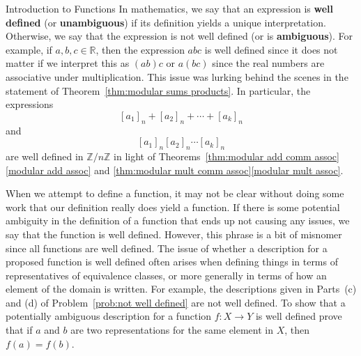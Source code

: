 \begin{section}{Introduction to Functions}
In mathematics, we say that an expression is \textbf{well defined} (or \textbf{unambiguous}) if its definition yields a unique interpretation.  Otherwise, we say that the expression is not well defined (or is \textbf{ambiguous}).  For example, if $a,b,c\in\mathbb{R}$, then the expression $abc$ is well defined since it does not matter if we interpret this as $(ab)c$ or $a(bc)$ since the real numbers are associative under multiplication.  This issue was lurking behind the scenes in the statement of Theorem~\ref{thm:modular sums products}.  In particular, the expressions
\[
[a_1]_n+[a_2]_n+\cdots+ [a_k]_n
\]
and
\[
[a_1]_n [a_2]_n \cdots  [a_k]_n
\]
are well defined in $\mathbb{Z}/n\mathbb{Z}$ in light of Theorems~\ref{thm:modular add comm assoc}\ref{modular add assoc} and \ref{thm:modular mult comm assoc}\ref{modular mult assoc}.

When we attempt to define a function, it may not be clear without doing some work that our definition really does yield a function. If there is some potential ambiguity in the definition of a function that ends up not causing any issues, we say that the function is well defined. However, this phrase is a bit of misnomer since all functions are well defined. The issue of whether a description for a proposed function is well defined often arises when defining things in terms of representatives of equivalence classes, or more generally in terms of how an element of the domain is written.  For example, the descriptions given in Parts~(c) and (d) of Problem~\ref{prob:not well defined} are not well defined.  To show that a potentially ambiguous description for a function $f:X\to Y$ is well defined prove that if $a$ and $b$ are two representations for the same element in $X$, then $f(a)=f(b)$.


\end{section}
